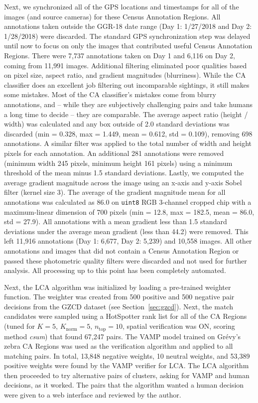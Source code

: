 Next, we synchronized all of the GPS locations and timestamps for all of the images (and source cameras) for these Census Annotation Regions.  All annotations taken outside the GGR-18 date range (Day 1: 1/27/2018 and Day 2: 1/28/2018) were discarded.  The standard GPS synchronization step was delayed until now to focus on only the images that contributed useful Census Annotation Regions.  There were 7,737 annotations taken on Day 1 and 6,116 on Day 2, coming from 11,991 images.  Additional filtering eliminated poor qualities based on pixel size, aspect ratio, and gradient magnitudes (blurriness).  While the CA classifier does an excellent job filtering out incomparable sightings, it still makes some mistakes.  Most of the CA classifier's mistakes come from blurry annotations, and -- while they are subjectively challenging pairs and take humans a long time to decide -- they are comparable.  The average aspect ratio (height / width) was calculated and any box outside of 2.0 standard deviations was discarded (min = 0.328, max = 1.449, mean = 0.612, std = 0.109), removing 698 annotations.  A similar filter was applied to the total number of width and height pixels for each annotation.  An additional 281 annotations were removed (minimum width 245 pixels, minimum height 161 pixels) using a minimum threshold of the mean minus 1.5 standard deviations.  Lastly, we computed the average gradient magnitude across the image using an x-axis and y-axis Sobel filter (kernel size 3).  The average of the gradient magnitude mean for all annotations was calculated as 86.0 on \texttt{uint8} RGB 3-channel cropped chip with a maximum-linear dimension of 700 pixels (min = 12.8, max = 182.5, mean = 86.0, std = 27.9).  All annotations with a mean gradient less than 1.5 standard deviations under the average mean gradient (less than 44.2) were removed.  This left 11,916 annotations (Day 1: 6,677, Day 2: 5,239) and 10,558 images.  All other annotations and images that did not contain a Census Annotation Region or passed these photometric quality filters were discarded and not used for further analysis.  All processing up to this point has been completely automated.

Next, the LCA algorithm was initialized by loading a pre-trained weighter function.  The weighter was created from 500 positive and 500 negative pair decisions from the GZCD dataset (see Section~\ref{sec:gzcd}).  Next, the match candidates were sampled using a HotSpotter rank list for all of the CA Regions (tuned for $K=5$, $K_{\text{norm}}=5$, $n_{\text{top}}=10$, spatial verification was ON, scoring method \textit{csum}) that found 67,247 pairs.  The VAMP model trained on Gr\'evy's zebra CA Regions was used as the verification algorithm and applied to all matching pairs.  In total, 13,848 negative weights, 10 neutral weights, and 53,389 positive weights were found by the VAMP verifier for LCA.  The LCA algorithm then proceeded to try alternative pairs of clusters, asking for VAMP and human decisions, as it worked.  The pairs that the algorithm wanted a human decision were given to a web interface and reviewed by the author.

